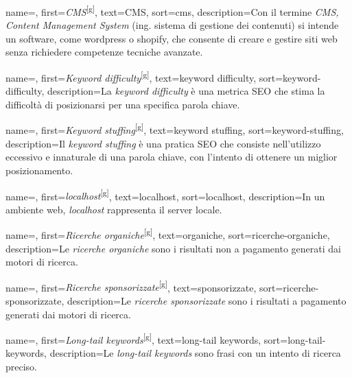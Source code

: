  {
    name=,
    first={\textit{CMS}\textsuperscript{[g]}},
    text=CMS,
    sort=cms,
    description={Con il termine \emph{CMS, Content Management System} (ing. sistema di gestione dei contenuti) si intende un software, come \gls{wordpress} o \gls{shopify}, che consente di creare e gestire siti web senza richiedere competenze tecniche avanzate.}
}

 {
    name=,
    first={\textit{Keyword difficulty}\textsuperscript{[g]}},
    text=keyword difficulty,
    sort=keyword-difficulty,
    description={La \emph{keyword difficulty} è una metrica SEO che stima la difficoltà di posizionarsi per una specifica parola chiave.}
}

 {
    name=,
    first={\textit{Keyword stuffing}\textsuperscript{[g]}},
    text=keyword stuffing,
    sort=keyword-stuffing,
    description={Il \emph{keyword stuffing} è una pratica SEO che consiste nell'utilizzo eccessivo e innaturale di una parola chiave, con l'intento di ottenere un miglior posizionamento.}
}

 {
    name=,
    first={\textit{localhost}\textsuperscript{[g]}},
    text=localhost,
    sort=localhost,
    description={In un ambiente web, \emph{localhost} rappresenta il server locale.}
}

 {
    name=,
    first={\textit{Ricerche organiche}\textsuperscript{[g]}},
    text=organiche,
    sort=ricerche-organiche,
    description={Le \emph{ricerche organiche} sono i risultati non a pagamento generati dai motori di ricerca.}
}

 {
    name=,
    first={\textit{Ricerche sponsorizzate}\textsuperscript{[g]}},
    text=sponsorizzate,
    sort=ricerche-sponsorizzate,
    description={Le \emph{ricerche sponsorizzate} sono i risultati a pagamento generati dai motori di ricerca.}
}

 {
    name=,
    first={\textit{Long-tail keywords}\textsuperscript{[g]}},
    text=long-tail keywords,
    sort=long-tail-keywords,
    description={Le \emph{long-tail keywords} sono frasi con un intento di ricerca preciso.}
}

